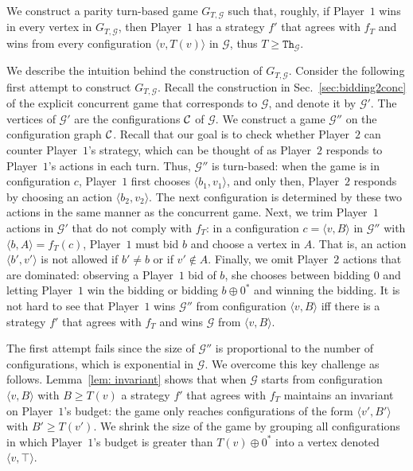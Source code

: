 \documentclass{theoretics}
\newcommand{\PO}{Player~$1$\xspace}
\newcommand{\PT}{Player~$2$\xspace}
\newcommand{\C}{{\cal C}}
\newcommand{\G}{{\mathcal G}}
\newcommand{\thresh}{\texttt{Th}\xspace}
\newcommand{\zug}[1]{\langle #1  \rangle}
\newcommand{\succb}[1]{#1 \oplus 0^*\xspace}
\begin{document}
We construct a parity turn-based game $G_{T, \G}$ such that, roughly, if \PO wins in every vertex in $G_{T, \G}$, then \PO has a strategy $f'$ that agrees with $f_T$ and wins from every configuration $\zug{v, T(v)}$ in $\G$, thus $T \geq \thresh_\G$. 

We describe the intuition behind the construction of $G_{T, \G}$. Consider the following first attempt to construct $G_{T, \G}$. 
Recall the construction in Sec.~\ref{sec:bidding2conc} of the explicit concurrent game that corresponds to $\G$, and denote it by $\G'$. The vertices of $\G'$ are the configurations $\C$ of $\G$. We construct a game $\G''$ on the configuration graph $\C$. 
Recall that our goal is to check whether \PT can counter \PO's strategy, which can be thought of as \PT responds to \PO's actions in each turn. Thus, $\G''$ is turn-based: when the game is in configuration $c$, \PO first chooses $\zug{b_1, v_1}$, and only then, \PT responds by choosing an action $\zug{b_2, v_2}$. The next configuration is determined by these two actions in the same manner as the concurrent game. 
Next, we trim \PO actions in $\G'$ that do not comply with $f_T$: in a configuration $c = \zug{v, B}$ in $\G''$ with $\zug{b, A} = f_T(c)$, \PO must bid $b$ and choose a vertex in $A$. That is, an action $\zug{b', v'}$ is not allowed if $b' \neq b$ or if $v' \notin A$. Finally, we omit \PT actions that are dominated: observing a \PO bid of $b$, she chooses between bidding $0$ and letting \PO win the bidding or bidding $\succb{b}$ and winning the bidding. 
It is not hard to see that \PO wins $\G''$ from configuration $\zug{v, B}$ iff there is a strategy $f'$ that agrees with $f_T$ and wins $\G$ from $\zug{v, B}$.

The first attempt fails since the size of $\G''$ is proportional to the number of configurations, which is exponential in $\G$. 
We overcome this key challenge as follows. 
Lemma~\ref{lem: invariant} shows that when $\G$ starts from configuration $\zug{v, B}$ with $B \geq T(v)$ a strategy $f'$ that agrees with $f_T$ maintains an invariant on \PO's budget: the game only reaches configurations of the form $\zug{v', B'}$ with $B' \geq T(v')$. 
We shrink the size of the game by grouping all configurations in which \PO's budget is greater than $\succb{T(v)}$ into a vertex denoted $\zug{v, \top}$. 
\end{document}
